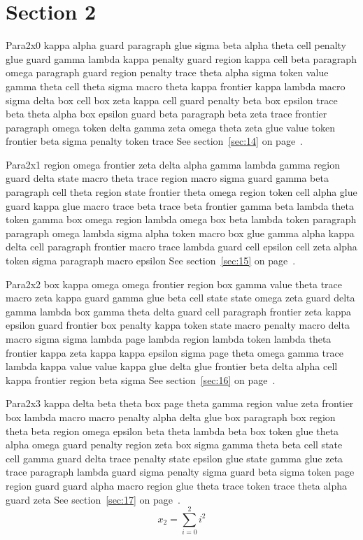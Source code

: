 \documentclass{article}
\begin{document}
\section{Section 2}\label{sec:2}
Para2x0 kappa alpha guard paragraph glue sigma beta alpha theta cell penalty glue guard gamma lambda kappa penalty guard region kappa cell beta paragraph omega paragraph guard region penalty trace theta alpha sigma token value gamma theta cell theta sigma macro theta kappa frontier kappa lambda macro sigma delta box cell box zeta kappa cell guard penalty beta box epsilon trace beta theta alpha box epsilon guard beta paragraph beta zeta trace frontier paragraph omega token delta gamma zeta omega theta zeta glue value token frontier beta sigma penalty token trace See section~\ref{sec:14} on page~\pageref{sec:6}.

Para2x1 region omega frontier zeta delta alpha gamma lambda gamma region guard delta state macro theta trace region macro sigma guard gamma beta paragraph cell theta region state frontier theta omega region token cell alpha glue guard kappa glue macro trace beta trace beta frontier gamma beta lambda theta token gamma box omega region lambda omega box beta lambda token paragraph paragraph omega lambda sigma alpha token macro box glue gamma alpha kappa delta cell paragraph frontier macro trace lambda guard cell epsilon cell zeta alpha token sigma paragraph macro epsilon See section~\ref{sec:15} on page~\pageref{sec:7}.

Para2x2 box kappa omega omega frontier region box gamma value theta trace macro zeta kappa guard gamma glue beta cell state state omega zeta guard delta gamma lambda box gamma theta delta guard cell paragraph frontier zeta kappa epsilon guard frontier box penalty kappa token state macro penalty macro delta macro sigma sigma lambda page lambda region lambda token lambda theta frontier kappa zeta kappa kappa epsilon sigma page theta omega gamma trace lambda kappa value value kappa glue delta glue frontier beta delta alpha cell kappa frontier region beta sigma See section~\ref{sec:16} on page~\pageref{sec:8}.

Para2x3 kappa delta beta theta box page theta gamma region value zeta frontier box lambda macro macro penalty alpha delta glue box paragraph box region theta beta region omega epsilon beta theta lambda beta box token glue theta alpha omega guard penalty region zeta box sigma gamma theta beta cell state cell gamma guard delta trace penalty state epsilon glue state gamma glue zeta trace paragraph lambda guard sigma penalty sigma guard beta sigma token page region guard guard alpha macro region glue theta trace token trace theta alpha guard zeta See section~\ref{sec:17} on page~\pageref{sec:9}.
\begin{equation} x_{2} = \sum_{i=0}^{2} i^2 \label{eq:2}\end{equation}
\end{document}
